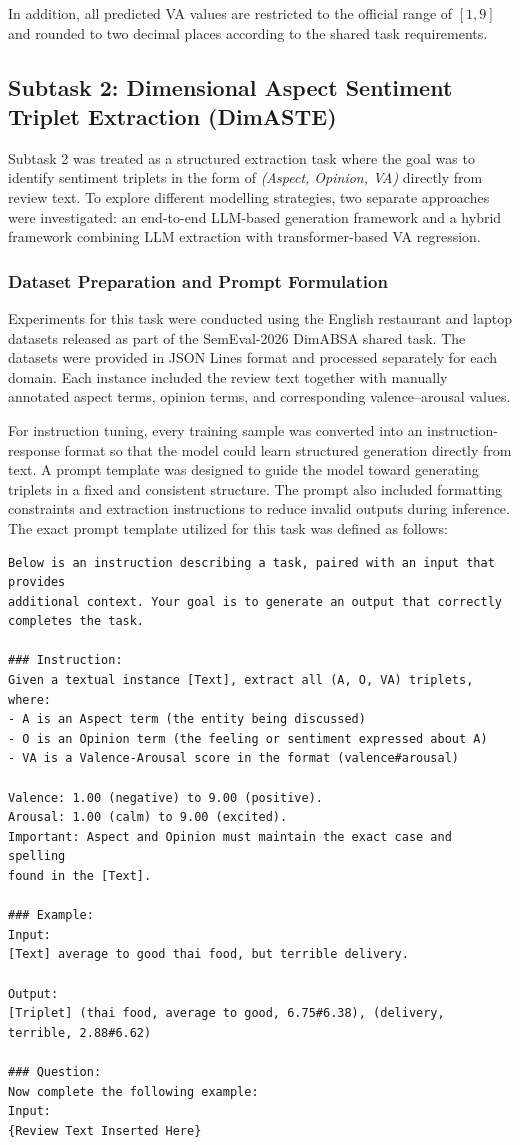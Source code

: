 \documentclass{article}
\begin{document}
In addition, all predicted VA values are restricted to the official range of $[1, 9]$ and rounded to two decimal places according to the shared task requirements.

\subsection{Subtask 2: Dimensional Aspect Sentiment Triplet Extraction (DimASTE)}
\label{subsec:subtask2_method}

Subtask 2 was treated as a structured extraction task where the goal was to identify sentiment triplets in the form of \textit{(Aspect, Opinion, VA)} directly from review text. To explore different modelling strategies, two separate approaches were investigated: an end-to-end LLM-based generation framework and a hybrid framework combining LLM extraction with transformer-based VA regression.

\subsubsection{Dataset Preparation and Prompt Formulation}

Experiments for this task were conducted using the English restaurant and laptop datasets released as part of the SemEval-2026 DimABSA shared task. The datasets were provided in JSON Lines format and processed separately for each domain. Each instance included the review text together with manually annotated aspect terms, opinion terms, and corresponding valence–arousal values.

For instruction tuning, every training sample was converted into an instruction-response format so that the model could learn structured generation directly from text. A prompt template was designed to guide the model toward generating triplets in a fixed and consistent structure. The prompt also included formatting constraints and extraction instructions to reduce invalid outputs during inference. The exact prompt template utilized for this task was defined as follows:

\begin{verbatim}
Below is an instruction describing a task, paired with an input that provides 
additional context. Your goal is to generate an output that correctly 
completes the task.

### Instruction:
Given a textual instance [Text], extract all (A, O, VA) triplets, where:
- A is an Aspect term (the entity being discussed)
- O is an Opinion term (the feeling or sentiment expressed about A)
- VA is a Valence-Arousal score in the format (valence#arousal)

Valence: 1.00 (negative) to 9.00 (positive).
Arousal: 1.00 (calm) to 9.00 (excited).
Important: Aspect and Opinion must maintain the exact case and spelling 
found in the [Text].

### Example:
Input:
[Text] average to good thai food, but terrible delivery.

Output:
[Triplet] (thai food, average to good, 6.75#6.38), (delivery, terrible, 2.88#6.62)

### Question:
Now complete the following example:
Input:
{Review Text Inserted Here}
\end{verbatim}
\end{document}
